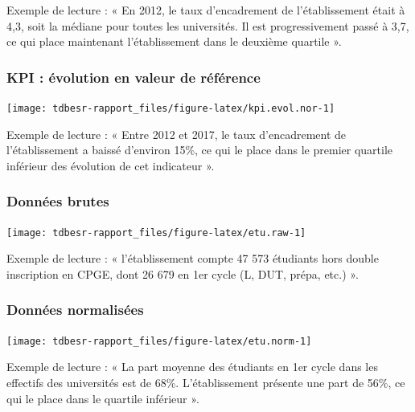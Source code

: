 \documentclass[12pt,french,landscape]{article}
\begin{document}
\begin{multicols}{2}
Exemple de lecture : « En 2012, le taux d'encadrement de l'établissement
était à 4,3, soit la médiane pour toutes les universités. Il est
progressivement passé à 3,7, ce qui place maintenant l'établissement
dans le deuxième quartile ».

\hypertarget{kpi-uxe9volution-en-valeur-de-ruxe9fuxe9rence}{%
\subsubsection{KPI : évolution en valeur de
référence}\label{kpi-uxe9volution-en-valeur-de-ruxe9fuxe9rence}}

\begin{center}\texttt{[image: tdbesr-rapport\_files/figure-latex/kpi.evol.nor-1]} \end{center}

Exemple de lecture : « Entre 2012 et 2017, le taux d'encadrement de
l'établissement a baissé d'environ 15\%, ce qui le place dans le premier
quartile inférieur des évolution de cet indicateur ».

\hypertarget{donnuxe9es-brutes}{%
\subsubsection{Données brutes}\label{donnuxe9es-brutes}}

\begin{center}\texttt{[image: tdbesr-rapport\_files/figure-latex/etu.raw-1]} \end{center}

Exemple de lecture : « l'établissement compte 47 573 étudiants hors
double inscription en CPGE, dont 26 679 en 1er cycle (L, DUT, prépa,
etc.) ».

\hypertarget{donnuxe9es-normalisuxe9es}{%
\subsubsection{Données normalisées}\label{donnuxe9es-normalisuxe9es}}

\begin{center}\texttt{[image: tdbesr-rapport\_files/figure-latex/etu.norm-1]} \end{center}

Exemple de lecture : « La part moyenne des étudiants en 1er cycle dans
les effectifs des universités est de 68\%. L'établissement présente une
part de 56\%, ce qui le place dans le quartile inférieur ».

\end{multicols}
\end{document}
